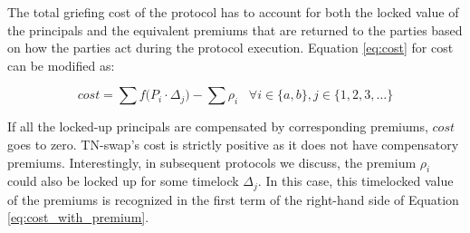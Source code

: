 The total griefing cost of the protocol has to account for both the locked value of the principals and the equivalent premiums that are returned to the parties based on how the parties act during the protocol execution. Equation \ref{eq:cost} for cost can be modified as:

\begin{equation} \label{eq:cost_with_premium}
 cost = \sum{f(P_i\cdot \Delta_j}) - \sum{\rho_i} \;\;\; \forall i \in \{a, b\}, j \in \{1, 2, 3, \ldots\}
\end{equation}

If all the locked-up principals are compensated by corresponding premiums, $cost$ goes to zero. TN-swap's cost is strictly positive as it does not have compensatory premiums. Interestingly, in subsequent protocols we discuss, the premium $\rho_i$ could also be locked up for some timelock $\Delta_j$. In this case, this timelocked value of the premiums is recognized in the first term of the right-hand side of Equation \ref{eq:cost_with_premium}.

